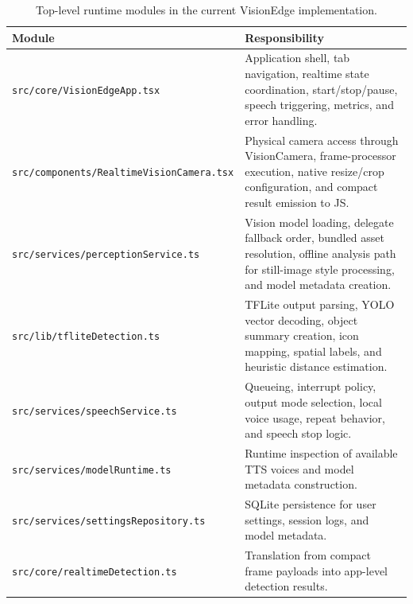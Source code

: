 \documentclass[conference]{IEEEtran}
\newcommand{\codepath}[1]{\begingroup\urlstyle{tt}\nolinkurl{#1}\endgroup}
\begin{document}
\begin{table}[t]
\centering
\small
\begin{tabularx}{\textwidth}{>{\raggedright\arraybackslash}p{} >{\raggedright\arraybackslash}X}
\toprule
Module & Responsibility \\
\midrule
\codepath{src/core/VisionEdgeApp.tsx} & Application shell, tab navigation, realtime state coordination, start/stop/pause, speech triggering, metrics, and error handling. \\
\codepath{src/components/RealtimeVisionCamera.tsx} & Physical camera access through VisionCamera, frame-processor execution, native resize/crop configuration, and compact result emission to JS. \\
\codepath{src/services/perceptionService.ts} & Vision model loading, delegate fallback order, bundled asset resolution, offline analysis path for still-image style processing, and model metadata creation. \\
\codepath{src/lib/tfliteDetection.ts} & TFLite output parsing, YOLO vector decoding, object summary creation, icon mapping, spatial labels, and heuristic distance estimation. \\
\codepath{src/services/speechService.ts} & Queueing, interrupt policy, output mode selection, local voice usage, repeat behavior, and speech stop logic. \\
\codepath{src/services/modelRuntime.ts} & Runtime inspection of available TTS voices and model metadata construction. \\
\codepath{src/services/settingsRepository.ts} & SQLite persistence for user settings, session logs, and model metadata. \\
\codepath{src/core/realtimeDetection.ts} & Translation from compact frame payloads into app-level detection results. \\
\bottomrule
\end{tabularx}
\caption{Top-level runtime modules in the current VisionEdge implementation.}
\label{tab:runtimemodules}
\end{table}
\end{document}
